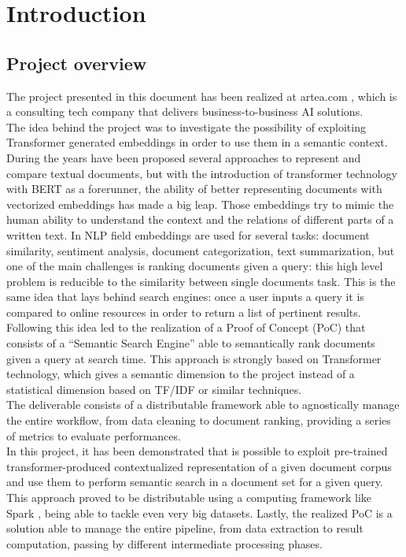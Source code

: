 \documentclass[\main/main.tex]{subfiles}
\begin{document}
\chapter*{Introduction}
\section*{Project overview}
The project presented in this document has been realized at artea.com \cite{artea}, which is a consulting tech company that delivers business-to-business AI solutions. \\
The idea behind the project was to investigate the possibility of exploiting Transformer generated embeddings in order to use them in a semantic context. During the years have been proposed several approaches to represent and compare textual documents, but with the introduction of transformer technology with BERT as a forerunner, the ability of better representing documents with vectorized embeddings has made a big leap. Those embeddings try to mimic the human ability to understand the context and the relations of different parts of a written text. In NLP field embeddings are used for several tasks: document similarity, sentiment analysis, document categorization, text summarization, but one of the main challenges is ranking documents given a query: this high level problem is reducible to the similarity between single documents task. This is the same idea that lays behind search engines: once a user inputs a query it is compared to online resources in order to return a list of pertinent results. \\
Following this idea led to the realization of a Proof of Concept (PoC) that consists of a ``Semantic Search Engine'' able to semantically rank documents given a query at search time. This approach is strongly based on Transformer technology, which gives a semantic dimension to the project instead of a statistical dimension based on TF/IDF or similar techniques. \\
The deliverable consists of a distributable framework able to agnostically manage the entire workflow, from data cleaning to document ranking, providing a series of metrics to evaluate performances. \\
In this project, it has been demonstrated that is possible to exploit pre-trained transformer-produced contextualized representation of a given document corpus and use them to perform semantic search in a document set for a given query. This approach proved to be distributable using a computing framework like Spark \cite{zaharia2010spark}, being able to tackle even very big datasets. Lastly, the realized PoC is a solution able to manage the entire pipeline, from data extraction to result computation, passing by different intermediate processing phases.
\end{document}
